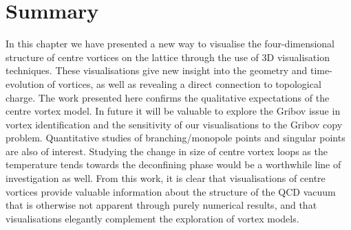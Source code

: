 \section{Summary}
In this chapter we have presented a new way to visualise the four-dimensional structure of centre vortices on the lattice through the use of 3D visualisation techniques. These visualisations give new insight into the geometry and time-evolution of vortices, as well as revealing a direct connection to topological charge. The work presented here confirms the qualitative expectations of the centre vortex model. In future it will be valuable to explore the Gribov issue in vortex identification and the sensitivity of our visualisations to the Gribov copy problem. Quantitative studies of branching/monopole points and singular points are also of interest. Studying the change in size of centre vortex loops as the temperature tends towards the deconfining phase would be a worthwhile line of investigation as well. From this work, it is clear that visualisations of centre vortices provide valuable information about the structure of the QCD vacuum that is otherwise not apparent through purely numerical results, and that visualisations elegantly complement the exploration of vortex models.
